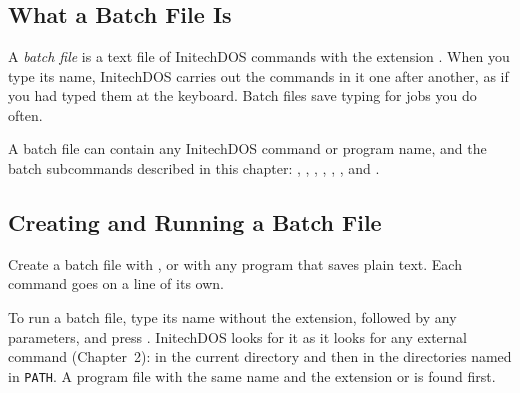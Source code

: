 \chapter{}

\section{What a Batch File Is}
A \emph{batch file} is a text file of InitechDOS commands with the extension
.  When you type its name, InitechDOS carries out the commands in
it one after another, as if you had typed them at the keyboard.  Batch files
save typing for jobs you do often.

A batch file can contain any InitechDOS command or program name, and the
batch subcommands described in this chapter: , ,
, , , ,  and .

\section{Creating and Running a Batch File}
Create a batch file with , or with any program that saves
plain text.  Each command goes on a line of its own.

To run a batch file, type its name without the extension, followed by any
parameters, and press .  InitechDOS looks for it as it looks for
any external command (Chapter~2): in the current directory and then in the
directories named in \texttt{PATH}.  A program file with the same name and
the extension  or  is found first.

